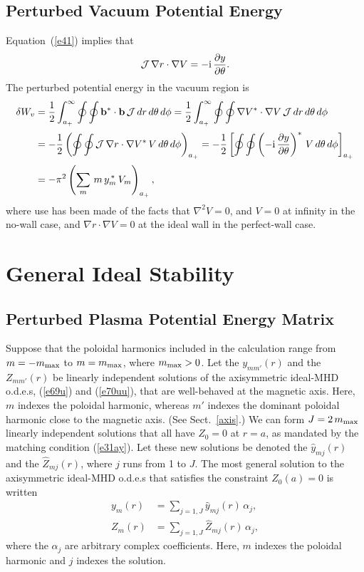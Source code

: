 \documentclass[12pt,prb,aps]{revtex4-1}
\begin{document}
\subsection{Perturbed Vacuum Potential Energy}
Equation~(\ref{e41}) implies that 
\begin{equation}
{\cal J} \,\nabla r\cdot\nabla V = - {\rm i}\,\frac{\partial y}{\partial \theta}.
\end{equation}
The perturbed potential energy in the vacuum region is\,\cite{tj1,gs1}
\begin{align}
\delta W_v &= \frac{1}{2}\int_{a_+}^\infty \oint\oint {\bf b}^\ast\cdot{\bf b}\,{\cal J}\,dr\,d\theta\,d\phi
=\frac{1}{2}\int_{a_+}^\infty \oint\oint \nabla V^\ast\cdot\nabla V\,{\cal J}\,dr\,d\theta\,d\phi\nonumber\\[0.5ex]
&= -\frac{1}{2}\left(\oint\oint {\cal J}\,\nabla r\cdot\nabla V^\ast\,V\,d\theta\,d\phi\right)_{a_+}
=-\frac{1}{2}\left[\oint\oint \left(-{\rm i}\,\frac{\partial y}{\partial \theta}\right)^\ast\,V\,d\theta\,d\phi\right]_{a_+}\nonumber\\[0.5ex]
&= - \pi^2\left(\sum_m\,m\,y_m^{\,\ast}\,V_m\right)_{a_+},\label{vac}
\end{align}
where use has been made of the facts that $\nabla^2 V =0$, and  $V=0$ at infinity in the no-wall case, and $\nabla r\cdot \nabla V=0$ at the ideal wall in the perfect-wall case. 

\section{General Ideal Stability}\label{ideal}

\subsection{Perturbed Plasma Potential Energy Matrix}\label{ideal1}
Suppose that the poloidal harmonics included in the calculation range from $m=-m_{\rm max}$ to $m=m_{\rm max}$, where $m_{\rm max} >0$. 
Let  the $y_{mm'}(r)$ and the $Z_{mm'}(r)$ be linearly independent solutions of the axisymmetric ideal-MHD o.d.e.s, (\ref{e69u}) and
(\ref{e70uu}), that are well-behaved at the magnetic axis. Here, $m$ indexes the poloidal harmonic, whereas $m'$ indexes the dominant poloidal harmonic close to the magnetic
axis. (See Sect.~\ref{axis}.)
We can form $J=2\,m_{\rm max}$ linearly independent solutions that all have $Z_0=0$ at $r=a$, as mandated by the matching condition (\ref{e31ay}). Let these
new solutions be denoted the $\hat{y}_{mj}(r)$ and the $\hat{Z}_{mj}(r)$, where $j$ runs from 1 to $J$. 
The most general solution to the axisymmetric ideal-MHD o.d.e.s that satisfies the constraint $Z_0(a)=0$ is written
\begin{align}
y_m(r) &= \sum_{j=1,J} \hat{y}_{mj}(r)\,\alpha_{j},\\[0.5ex]
Z_m(r)&= \sum_{j=1,J} \hat{Z}_{mj}(r)\,\alpha_{j},
\end{align}
where the $\alpha_j$ are arbitrary complex coefficients. Here, $m$ indexes the poloidal harmonic and $j$ indexes the solution. 
 
\end{document}
